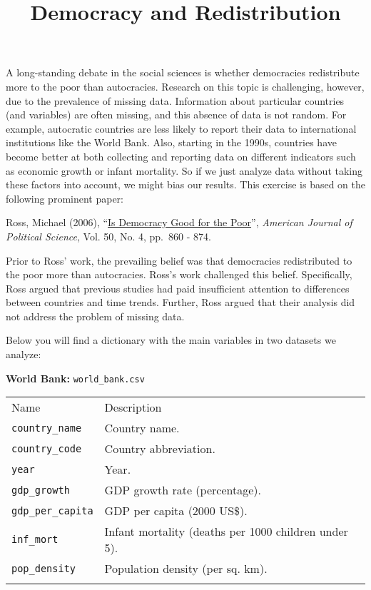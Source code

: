 \documentclass[]{article}
\title{Democracy and Redistribution}
\author{}
\date{}
\begin{document}
\maketitle


A long-standing debate in the social sciences is whether democracies
redistribute more to the poor than autocracies. Research on this topic
is challenging, however, due to the prevalence of missing data.
Information about particular countries (and variables) are often
missing, and this absence of data is not random. For example, autocratic
countries are less likely to report their data to international
institutions like the World Bank. Also, starting in the 1990s, countries
have become better at both collecting and reporting data on different
indicators such as economic growth or infant mortality. So if we just
analyze data without taking these factors into account, we might bias
our results. This exercise is based on the following prominent paper:

Ross, Michael (2006),
``\href{https://doi.org/10.1111/j.1540-5907.2006.00220.x}{Is Democracy
Good for the Poor}'', \emph{American Journal of Political Science}, Vol.
50, No. 4, pp.~860 - 874.

Prior to Ross' work, the prevailing belief was that democracies
redistributed to the poor more than autocracies. Ross's work challenged
this belief. Specifically, Ross argued that previous studies had paid
insufficient attention to differences between countries and time trends.
Further, Ross argued that their analysis did not address the problem of
missing data.

Below you will find a dictionary with the main variables in two datasets
we analyze:

\textbf{World Bank:} \texttt{world\_bank.csv}

\begin{longtable}[c]{@{}ll@{}}
\toprule\addlinespace
Name & Description
\\\addlinespace
\midrule\endhead
\texttt{country\_name} & Country name.
\\\addlinespace
\texttt{country\_code} & Country abbreviation.
\\\addlinespace
\texttt{year} & Year.
\\\addlinespace
\texttt{gdp\_growth} & GDP growth rate (percentage).
\\\addlinespace
\texttt{gdp\_per\_capita} & GDP per capita (2000 US\$).
\\\addlinespace
\texttt{inf\_mort} & Infant mortality (deaths per 1000 children under
5).
\\\addlinespace
\texttt{pop\_density} & Population density (per sq. km).
\\\addlinespace
\bottomrule
\end{longtable}
\end{document}

